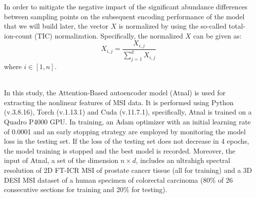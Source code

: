 \documentclass{WileyMSP-template}
\begin{document}
In order to mitigate the negative impact 
of the significant abundance differences 
between sampling points on the subsequent encoding performance 
of the model that we will build later, 
the vector $X$ is normalized 
by using the so-called total-ion-count (TIC) normalization. 
Specifically, the normalized $X$ can be given as:
\begin{equation}
  \label {eqn:ticnorm}
  X_{i,j}= \frac{X_{i,j}}{\sum_{j=1}^{d}X_{i,j}} 
\end{equation}
where $i\in [1,n]$.

 \\
In this study, the Attention-Based autoencoder model (Atnal) is used for 
extracting the nonlinear features of MSI data. It is performed using Python (v.3.8.16), Torch (v.1.13.1) 
and Cuda (v.11.7.1), specifically, Atnal is trained on a Quadro P4000 GPU. In training, 
an Adam optimizer with an initial learning rate of 0.0001 and an early stopping 
strategy are employed by monitoring 
the model loss in the testing set. If the loss of the testing set does not 
decrease in 4 epochs, the model training is stopped and the best model is recorded. 
Moreover, the input of Atnal, a set of the dimension $n \times d$, includes 
an ultrahigh spectral resolution of 2D FT-ICR MSI of prostate cancer tissue (all for training)
and a 3D DESI MSI dataset of a human specimen of colorectal carcinoma 
(80\% of 26 consecutive sections for training and 20\% for testing).
\end{document}
